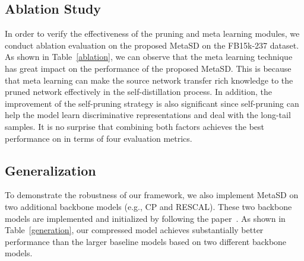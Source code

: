 \documentclass[11pt]{article}
\begin{document}
\begin{table}
\centering
{}
\caption{\label{ablation}
Results of ablation study on FB15k-237.  and  denote the pruning and meta learning techniques.
}
\end{table}
\subsection{Ablation Study}
In order to verify the effectiveness of the pruning and meta learning modules, we conduct ablation evaluation on the proposed MetaSD on the FB15k-237 dataset. As shown in Table~\ref{ablation}, we can observe that the meta learning technique has great impact on the performance of the proposed MetaSD. This is because that meta learning can make the source network transfer rich knowledge to the pruned network effectively in the self-distillation process. In addition, the improvement of the self-pruning strategy is also significant since self-pruning can help the model learn discriminative representations and deal with the long-tail samples.  It is no surprise that combining both factors achieves the best performance on in terms of four evaluation metrics.



\subsection{Generalization}
To demonstrate the robustness of our framework, we also implement MetaSD on two additional backbone models (e.g., CP and RESCAL).
These two backbone models are implemented and initialized by following the paper~\citep{zhang2020duality}.
As shown in Table~\ref{generation}, our compressed model achieves substantially better performance than the larger baseline models based on two different backbone models.
\end{document}
